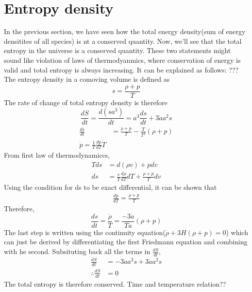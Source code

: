 \documentclass[12pt,a4paper,oneside]{book}
\begin{document}
\section{Entropy density}
In the previous section, we have seen how the total energy density(sum of energy densitites of all species) is nt a conserved quantity. Now, we'll see that the total entropy in the universe is a conserved quantity. These two statements might sound like violation of laws of thermodyanmics, where conservation of energy is valid and total entropy is always increasing. It can be explained as follows: ???
\\ The entropy density in a comoving volume is defined as 
\begin{equation}
    s = \frac{\rho + p}{T}
\end{equation}
The rate of change of total entropy density is therefore
\begin{equation}
    \frac{dS}{dt} =\frac{d(sa^3)}{dt} = a^3\frac{ds}{dt} + 3\dot{a}a^2s
\end{equation}
\begin{align}
    \frac{ds}{dt} &= \frac{\dot{\rho}+\dot{p}}{T} -\frac{\dot{T}}{T^2}(\rho + p)\\
    \dot{p} = \frac{1}{T}\frac{dp}{dT}\dot{T}
\end{align}
From first law of thermodynamiccs,
\begin{align}
    Tds &= d(\rho v) + pdv\\
    ds &= \frac{v}{T}\frac{d\rho}{dT}dT+ \frac{\rho + p}{T}dv 
\end{align}
Using the condition for ds to be exact differential, it can be shown that
\begin{align}
     \frac{dp}{dT} = \frac{\rho +p}{T}
\end{align}
Therefore,
\begin{equation}
    \frac{ds}{dt} = \frac{\dot{\rho}}{T} = \frac{-3\dot{a}}{Ta}(\rho+p)
\end{equation}
The last step is written using the continuity equation($ \dot{\rho} + 3H(\rho+p)=0$) which can just be derived by differentiating the first Friedmann equation and combining with he second. Subsituting back all the terms in $\frac{dS}{dt}$,
\begin{align}
    \frac{dS}{dt} &= -3\dot{a}a^2s+3\dot{a}a^2s \\
    \therefore  \frac{dS}{dt} &= 0
\end{align}
The total entropy is therefore conserved.
Time and temperature relation??
\end{document}
